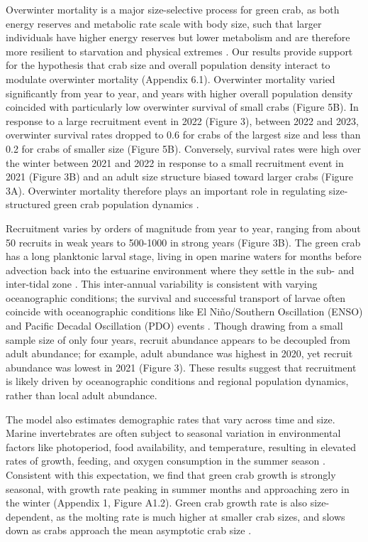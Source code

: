 \documentclass{article}
\begin{document}
Overwinter mortality is a major size-selective process for green crab, as both energy reserves and metabolic rate scale with body size, such that larger individuals have higher energy reserves but lower metabolism and are therefore more resilient to starvation and physical extremes \parencite{carlson2008seasonal, sogard1997size}. Our results provide support for the hypothesis that crab size and overall population density interact to modulate overwinter mortality (Appendix 6.1). Overwinter mortality varied significantly from year to year, and years with higher overall population density coincided with particularly low overwinter survival of small crabs (Figure 5B). In response to a large recruitment event in 2022 (Figure 3), between 2022 and 2023, overwinter survival rates dropped to 0.6 for crabs of the largest size and less than 0.2 for crabs of smaller size (Figure 5B). Conversely, survival rates were high over the winter between 2021 and 2022 in response to a small recruitment event in 2021 (Figure 3B) and an adult size structure biased toward larger crabs (Figure 3A). Overwinter mortality therefore plays an important role in regulating size-structured green crab population dynamics \parencite{henderson1988size}. 

Recruitment varies by orders of magnitude from year to year, ranging from about 50 recruits in weak years to 500-1000 in strong years (Figure 3B). The green crab has a long planktonic larval stage, living in open marine waters for months before advection back into the estuarine environment where they settle in the sub- and inter-tidal zone \parencite{yamada2001global}. This inter-annual variability is consistent with varying oceanographic conditions; the survival and successful transport of larvae often coincide with oceanographic conditions like El Niño/Southern Oscillation (ENSO) and Pacific Decadal Oscillation (PDO) events \parencite{yamada2021ocean}. Though drawing from a small sample size of only four years, recruit abundance appears to be decoupled from adult abundance; for example, adult abundance was highest in 2020, yet recruit abundance was lowest in 2021 (Figure 3). These results suggest that recruitment is likely driven by oceanographic conditions and regional population dynamics, rather than local adult abundance. 

The model also estimates demographic rates that vary across time and size. Marine invertebrates are often subject to seasonal variation in environmental factors like photoperiod, food availability, and temperature, resulting in elevated rates of growth, feeding, and oxygen consumption in the summer season \parencite{brockington2001relative}. Consistent with this expectation, we find that green crab growth is strongly seasonal, with growth rate peaking in summer months and approaching zero in the winter (Appendix 1, Figure A1.2). Green crab growth rate is also size-dependent, as the molting rate is much higher at smaller crab sizes, and slows down as crabs approach the mean asymptotic crab size \parencite{yamada2005growth}.
\end{document}
